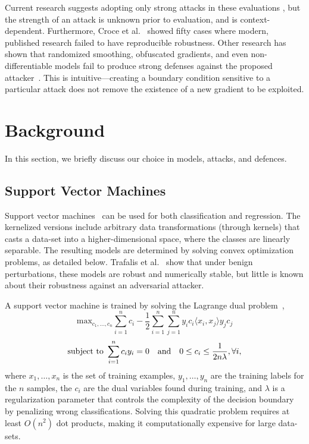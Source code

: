 \documentclass[fonts]{icst}
\begin{document}
Current research suggests adopting only strong attacks in these evaluations \cite{carlini2019evaluating}, but the strength of an attack is unknown prior to evaluation, and is context-dependent. Furthermore, Croce et al.~\cite{croce2020reliable} showed fifty cases where modern, published research failed to have reproducible robustness. Other research has shown that randomized smoothing, obfuscated gradients, and even non-differentiable models fail to produce strong defenses against the proposed attacker~\cite{carlini2017towards,athalye2018obfuscated,uesato2018adversarial}. This is intuitive---creating a boundary condition sensitive to a particular attack does not remove the existence of a new gradient to be exploited. 


\section{Background}
In this section, we briefly discuss our choice in models, attacks, and defences.
\subsection{Support Vector Machines}

Support vector machines~\cite{cortes1995support} can be used for both classification and regression. The kernelized versions include arbitrary data transformations (through kernels) that casts a data-set into a higher-dimensional space, where the classes are linearly separable. The resulting models are determined by solving convex optimization problems, as detailed below. Trafalis et al.~\cite{trafalis2007robust} show that under benign perturbations, these models are robust and numerically stable, but little is known about their robustness against an adversarial attacker.

A support vector machine is trained by solving the Lagrange dual problem~\cite{cortes1995support},
\begin{equation}
    \textrm{max}_{c_1,\ldots,c_n}
    \sum_{i = 1}^n c_i - \frac{1}{2} \sum_{i = 1}^n \sum_{j = 1}^n y_i c_i \langle x_i, x_j \rangle y_j c_j
    \label{eq:linear_svm}
\end{equation}
$$
    \textrm{subject to } \sum_{i = 1}^n c_i y_i = 0 \textrm{\quad and\quad} 0 \leq c_i \leq \frac{1}{2n\lambda}, \forall i,
$$
where $x_1,\ldots,x_n$ is the set of training examples, $y_1,\ldots,y_n$ are the training labels for the $n$ samples, the $c_i$ are the dual variables found during training, and $\lambda$ is a regularization parameter that controls the complexity of the decision boundary by penalizing wrong classifications. Solving this quadratic problem requires at least $O(n^2)$ dot products, making it computationally expensive for large data-sets.
\end{document}
